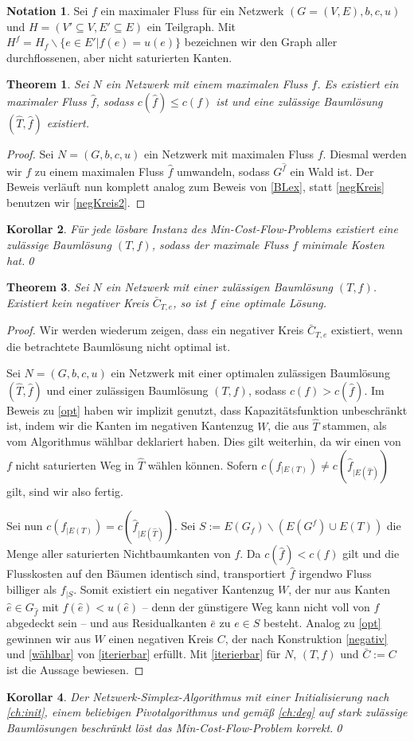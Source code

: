 \documentclass[a4paper,twoside,ngerman]{report}
\theoremstyle{plain}
\newtheorem{thm}{Theorem}
\newtheorem{kor}[thm]{Korollar}
\theoremstyle{definition}
\newtheorem*{nota}{Notation}
\begin{document}
\begin{nota}Sei $f$ ein maximaler Fluss für ein Netzwerk $(G=(V,E),b,c,u)$ und $H=(V'\subseteq V, E'\subseteq E)$ ein Teilgraph. Mit $H^f=H_f\backslash\{e\in E'|f(e)=u(e)\}$ bezeichnen wir den Graph aller durchflossenen, aber nicht saturierten Kanten.\end{nota}

\begin{thm}\label{BLex2}Sei $N$ ein Netzwerk mit einem maximalen Fluss $f$. Es existiert ein maximaler Fluss $\hat{f}$, sodass $c(\hat{f})\leq c(f)$ ist und eine zulässige Baumlösung $(\hat{T},\hat{f})$ existiert.\end{thm}
\begin{proof}Sei $N=(G,b,c,u)$ ein Netzwerk mit maximalen Fluss $f$. Diesmal werden wir $f$ zu einem maximalen Fluss $\hat{f}$ umwandeln, sodass $G^{\hat{f}}$ ein Wald ist. Der Beweis verläuft nun komplett analog zum Beweis von \cref{BLex}, statt \cref{negKreis} benutzen wir \cref{negKreis2}.\end{proof}

\begin{kor}Für jede lösbare Instanz des Min-Cost-Flow-Problems existiert eine zulässige Baumlösung $(T,f)$, sodass der maximale Fluss $f$ minimale Kosten hat.\qed\end{kor}

\begin{thm}\label{opt2}Sei $N$ ein Netzwerk mit einer zulässigen Baumlösung $(T,f)$. Existiert kein negativer Kreis $\bar{C}_{T,e}$, so ist $f$ eine optimale Lösung.\end{thm}
\begin{proof}Wir werden wiederum zeigen, dass ein negativer Kreis $\bar{C}_{T,e}$ existiert, wenn die betrachtete Baumlösung nicht optimal ist.

Sei $N=(G,b,c,u)$ ein Netzwerk mit einer optimalen zulässigen Baumlösung $(\hat{T},\hat{f})$ und einer zulässigen Baumlösung $(T,f)$, sodass $c(f)>c(\hat{f})$. Im Beweis zu \cref{opt} haben wir implizit genutzt, dass Kapazitätsfunktion unbeschränkt ist, indem wir die Kanten im negativen Kantenzug $W$, die aus $\hat{T}$ stammen, als vom Algorithmus wählbar deklariert haben. Dies gilt weiterhin, da wir einen von $f$ nicht saturierten Weg in $\hat{T}$ wählen können. Sofern $c(f_{|E(T)})\neq c(\hat{f}_{|E(\hat{T})})$ gilt, sind wir also fertig.

Sei nun $c(f_{|E(T)})=c(\hat{f}_{|E(\hat{T})})$. Sei $S:=E(G_f)\backslash (E(G^f)\cup E(T))$ die Menge aller saturierten Nichtbaumkanten von $f$. Da $c(\hat{f})<c(f)$ gilt und die Flusskosten auf den Bäumen identisch sind, transportiert $\hat{f}$ irgendwo Fluss billiger als $f_{|S}$. Somit existiert ein negativer Kantenzug $W$, der nur aus Kanten $\hat{e}\in G_{\hat{f}}$ mit $f(\hat{e})<u(\hat{e})$ -- denn der günstigere Weg kann nicht voll von $f$ abgedeckt sein -- und aus Residualkanten $\bar{e}$ zu $e\in S$ besteht. Analog zu \cref{opt} gewinnen wir aus $W$ einen negativen Kreis $C$, der nach Konstruktion \cref{negativ} und \cref{wählbar} von \cref{iterierbar} erfüllt. Mit \cref{iterierbar} für $N$, $(T,f)$ und $\bar{C}:=C$ ist die Aussage bewiesen.
\end{proof}

\begin{kor}Der Netzwerk-Simplex-Algorithmus mit einer Initialisierung nach \cref{ch:init}, einem beliebigen Pivotalgorithmus und gemäß \cref{ch:deg} auf stark zulässige Baumlösungen beschränkt löst das Min-Cost-Flow-Problem korrekt.\qed\end{kor}
\end{document}
